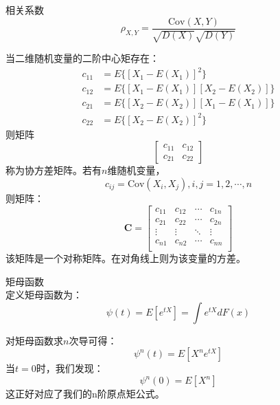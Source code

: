 \begin{definition}{相关系数}
    \begin{equation}
        \rho_{X,Y}=\frac{\mathrm{Cov}(X,Y)}{\sqrt{D(X)}\sqrt{D(Y)}}
    \end{equation}
\end{definition}

当二维随机变量的二阶中心矩存在：
\begin{equation}
    \begin{aligned}
        c_{11}&=E\{[ X_1-E(X_1) ]^2\}\\
        c_{12}&=E\{[ X_1-E(X_1) ][ X_2-E(X_2) ]\}\\
        c_{21}&=E\{[ X_2-E(X_2) ][ X_1-E(X_1) ]\}\\
        c_{22}&=E\{[ X_2-E(X_2) ]^2\}
    \end{aligned}
\end{equation}
则矩阵$$ \left[\begin{matrix}
    c_{11}&c_{12}\\
    c_{21}&c_{22}
\end{matrix}\right] $$
称为协方差矩阵。若有$n$维随机变量，
\begin{equation}
    c_{ij}=\mathrm{Cov}(X_i,X_j),i,j=1,2,\cdots,n
\end{equation}
则矩阵：
\begin{equation}
    \mathbf{C}=\left[
    \begin{matrix}
        c_{11} & c_{12} & \cdots & c_{1n}\\
        c_{21} & c_{22} & \cdots & c_{2n}\\
        \vdots & \vdots & \ddots & \vdots\\
        c_{n1} & c_{n2} & \cdots & c_{nn}\\
    \end{matrix}
    \right]
\end{equation}
该矩阵是一个对称矩阵。在对角线上则为该变量的方差。

\begin{definition}{矩母函数\\}
    定义矩母函数为：\begin{equation}
        \psi(t)=E[e^{tX}]=\int e^{tX}dF(x)
    \end{equation}
\end{definition}
对矩母函数求$n$次导可得：
\begin{equation}
    \psi^{n}(t) = E[X^n e^{tX}]
\end{equation}
当$t=0$时，我们发现：
\begin{equation}
    \psi ^n(0) = E[X^n]
\end{equation}
这正好对应了我们的n阶原点矩公式。
